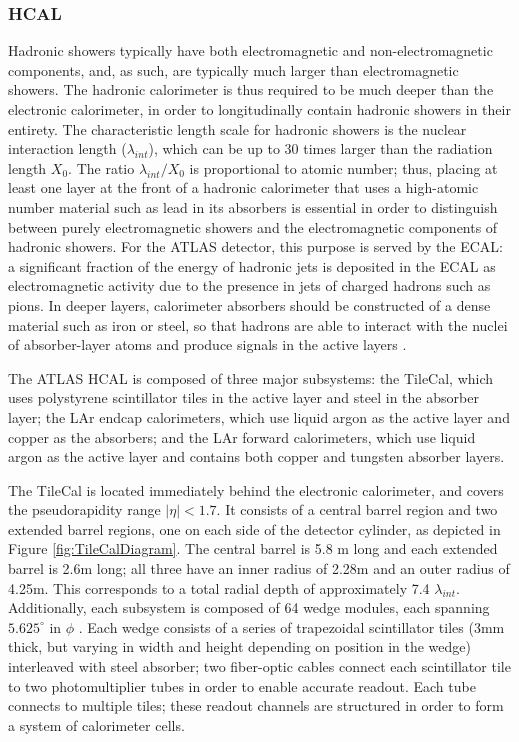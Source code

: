 \subsubsection{HCAL} \label{sec:HCAL} 

Hadronic showers typically have both electromagnetic and non-electromagnetic components, and, as such, are typically much larger than electromagnetic showers.  The hadronic calorimeter is thus required to be much deeper than the electronic calorimeter, in order to longitudinally contain hadronic showers in their entirety. The characteristic length scale for hadronic showers is the nuclear interaction length ($\lambda_{int}$), which can be up to 30 times larger than the radiation length $X_0$. The ratio $\lambda_{int} / X_0 $ is proportional to atomic number; thus, placing at least one layer at the front of a hadronic calorimeter that uses a high-atomic number material such as lead in its absorbers is essential in order to distinguish between purely electromagnetic showers and the electromagnetic components of hadronic showers. For the ATLAS detector, this purpose is served by the ECAL: a significant fraction of the energy of hadronic jets is deposited in the ECAL as electromagnetic activity due to the presence in jets of charged hadrons such as pions. In deeper layers, calorimeter absorbers should be constructed of a dense material such as iron or steel, so that hadrons are able to interact with the nuclei of absorber-layer atoms and produce signals in the active layers \cite{misconceptions}.  

The ATLAS HCAL is composed of three major subsystems: the TileCal, which uses polystyrene scintillator tiles in the active layer and steel in the absorber layer; the LAr endcap calorimeters, which use liquid argon as the active layer and copper as the absorbers; and the LAr forward calorimeters, which use liquid argon as the active layer and contains both copper and tungsten absorber layers.

The TileCal is located immediately behind the electronic calorimeter, and covers the pseudorapidity range $|\eta |< 1.7$. It consists of a central barrel region and two extended barrel regions, one on each side of the detector cylinder, as depicted in Figure \ref{fig:TileCalDiagram}. The central barrel is 5.8 m long and each extended barrel is 2.6m long; all three have an inner radius of 2.28m and an outer radius of 4.25m. This corresponds to a total radial depth of approximately 7.4 $\lambda_{int}$. Additionally, each subsystem is composed of 64 wedge modules, each spanning $5.625 ^{\circ}$ in $\phi$ . Each wedge consists of a series of trapezoidal scintillator tiles (3mm thick, but varying in width and height depending on position in the wedge) interleaved with steel absorber; two fiber-optic cables connect each scintillator tile to two photomultiplier tubes in order to enable accurate readout. Each tube connects to multiple tiles; these readout channels are structured in order to form a system of calorimeter cells. 

